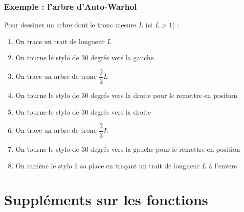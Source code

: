 \documentclass[x11names,svgnames]{beamer}
\begin{document}
\begin{frame}
  \frametitle{Exemple : l'arbre d'Auto-Warhol}

  Pour dessiner un arbre dont le tronc mesure $L$ (si $L > 1$) :
  \begin{enumerate}
  \item On trace un trait de longueur $L$
  \item On tourne le stylo de $30$ degrés vers la gauche
  \item On trace un arbre de tronc $\dfrac{2}{3} L$
  \item On tourne le stylo de $30$ degrés vers la droite \newline pour le remettre en position
  \item On tourne le stylo de $30$ degrés vers la droite
  \item On trace un arbre de tronc $\dfrac{2}{3} L$
  \item On tourne le stylo de 30 degrés vers la gauche \newline pour le remettre en position
  \item On ramène le stylo à sa place en traçant un trait de longueur $L$ à l'envers
  \end{enumerate}
  
\end{frame}

\section{Suppléments sur les fonctions}
\end{document}
